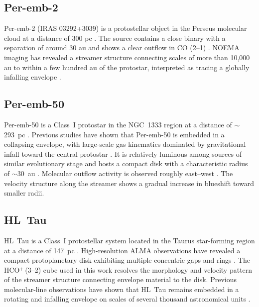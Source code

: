 \subsection{Per-emb-2}
Per-emb-2 (IRAS 03292+3039) is a protostellar object in the Perseus molecular cloud at a distance of 300 pc \citep{Zucker_2018}. The source contains a close binary with a separation of around 30 au \citep{Tobin_2018} and shows a clear outflow in CO (2--1) \citep{Stephens_2019}. NOEMA imaging has revealed a streamer structure connecting scales of more than 10,000 au to within a few hundred au of the protostar, interpreted as tracing a globally infalling envelope \citep{Pineda_2020}.

\subsection{Per-emb-50}
Per-emb-50 is a Class~I protostar in the NGC~1333 region at a distance of $\sim$293~pc \citep{Ortiz_2018}. Previous studies have shown that Per-emb-50 is embedded in a collapsing envelope, with large-scale gas kinematics dominated by gravitational infall toward the central protostar \citep{Valdivia-Mena_2022}. It is relatively luminous among sources of similar evolutionary stage and hosts a compact disk with a characteristic radius of $\sim$30~au \citep{Segura_2016}. Molecular outflow activity is observed roughly east--west \citep{Stephens_2019}. The velocity structure along the streamer shows a gradual increase in blueshift toward smaller radii.

\subsection{HL~Tau}
HL~Tau is a Class~I protostellar system located in the Taurus star-forming region at a distance of 147~pc \citep{Galli_2018}. High-resolution ALMA observations have revealed a compact protoplanetary disk exhibiting multiple concentric gaps and rings \citep{Yen_2019}. The HCO$^{+}$\,(3--2) cube used in this work resolves the morphology and velocity pattern of the streamer structure connecting envelope material to the disk. Previous molecular-line observations have shown that HL~Tau remains embedded in a rotating and infalling envelope on scales of several thousand astronomical units \citep{Hayashi_1993,Yen_2019}.

